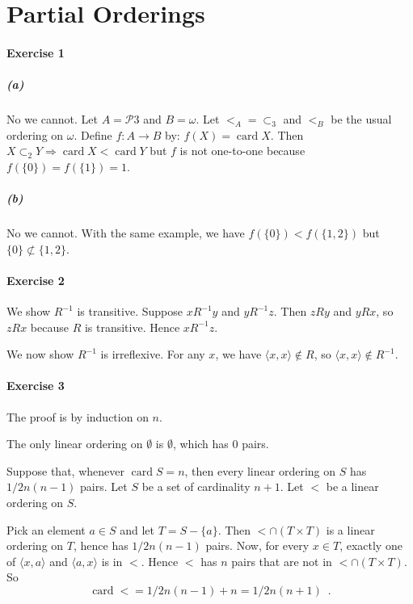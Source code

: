 \documentclass{report}
\newcommand{\card}{\ensuremath{\operatorname{card}}}
\newcommand{\inv}[1]{\ensuremath{{#1}^{-1}}}
\begin{document}
     \section{Partial Orderings}

     \paragraph{Exercise 1}

     \subparagraph{(a)}
     No we cannot. Let $A = \mathcal{P} 3$ and $B = \omega$. Let $<_A = \subset_3$ and $<_B$ be the usual
     ordering on $\omega$. Define $f : A \rightarrow B$ by: $f(X) = \card X$. Then $X \subset_2 Y \Rightarrow
     \card X < \card Y$ but $f$ is not one-to-one because $f(\{0\}) = f(\{1\}) = 1$.

     \subparagraph{(b)}
     No we cannot. With the same example, we have $f(\{0\}) < f(\{1,2\})$ but $\{0\} \not\subset \{1,2\}$.

     \paragraph{Exercise 2}
     We show $\inv{R}$ is transitive. Suppose $x \inv{R} y$ and $y \inv{R} z$. Then $zRy$ and $yRx$, so $zRx$
     because $R$ is transitive. Hence $x \inv{R} z$.

     We now show $\inv{R}$ is irreflexive. For any $x$, we have $\langle x,x \rangle \notin R$, so
     $\langle x,x \rangle \notin \inv{R}$.

     \paragraph{Exercise 3}
     The proof is by induction on $n$.

     The only linear ordering on $\emptyset$ is $\emptyset$, which has 0 pairs.

     Suppose that, whenever $\card S = n$, then every linear ordering on $S$ has $1/2 n (n-1)$ pairs.
     Let $S$ be a set of cardinality $n+1$. Let $<$ be a linear ordering on $S$.

     Pick an element $a \in S$ and let $T = S - \{a\}$. Then $< \cap (T \times T)$ is a linear ordering on $T$,
     hence has $1/2 n (n-1)$ pairs. Now, for every $x \in T$, exactly one of $\langle x, a \rangle$
     and $\langle a,x \rangle$ is in $<$. Hence $<$ has $n$ pairs that are not in $< \cap (T \times T)$.
     So
     \[ \card < = 1/2 n (n-1) + n = 1/2 n (n+1) \enspace . \]
\end{document}
